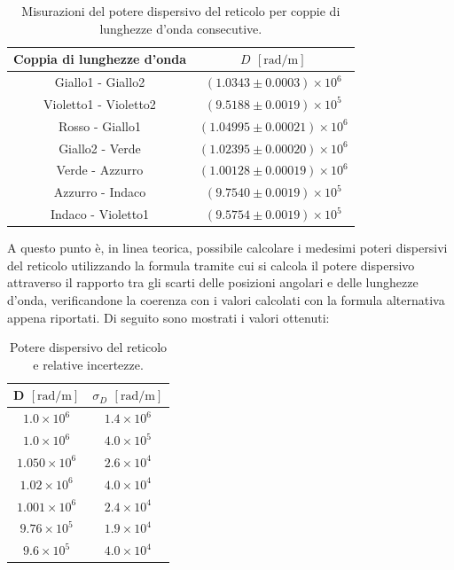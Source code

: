 \documentclass[a4paper,12pt]{article}
\begin{document}
\begin{table}[H]
\centering
\begin{tabular}{cc}
\hline
\textbf{Coppia di lunghezze d’onda} & \textbf{\( D \)} \([\text{rad}/\text{m}] \) \\ 
\hline
Giallo1 - Giallo2 & \( (1.0343 \pm 0.0003) \times 10^6 \) \\ 
Violetto1 - Violetto2 & \( (9.5188 \pm 0.0019) \times 10^5 \) \\ 
Rosso - Giallo1 & \( (1.04995 \pm 0.00021) \times 10^6 \) \\ 
Giallo2 - Verde & \( (1.02395 \pm 0.00020) \times 10^6 \) \\ 
Verde - Azzurro & \( (1.00128 \pm 0.00019) \times 10^6 \) \\ 
Azzurro - Indaco & \( (9.7540 \pm 0.0019) \times 10^5 \) \\ 
Indaco - Violetto1 & \( (9.5754 \pm 0.0019) \times 10^5 \) \\ 
\hline
\end{tabular}
\caption{Misurazioni del potere dispersivo del reticolo per coppie di lunghezze d’onda consecutive.}
\end{table}
A questo punto è, in linea teorica, possibile calcolare i medesimi poteri dispersivi del reticolo utilizzando la formula tramite cui si calcola il potere dispersivo attraverso il rapporto tra gli scarti delle posizioni angolari e delle lunghezze d’onda, verificandone la coerenza con i valori calcolati con la formula alternativa appena riportati.
Di seguito sono mostrati i valori ottenuti:
\begin{table}[H]
    \centering
    \begin{tabular}{cc}
    \hline
    \textbf{D} \([\text{rad}/\text{m}] \) & \textbf{\(\sigma_D\)} \([\text{rad}/\text{m}] \) \\ 
    \hline
    \( 1.0 \times 10^6 \) & \( 1.4 \times 10^6 \) \\ 
    \( 1.0 \times 10^6 \) & \( 4.0 \times 10^5 \) \\ 
    \( 1.050 \times 10^6 \) & \( 2.6 \times 10^4 \) \\ 
    \( 1.02 \times 10^6 \) & \( 4.0 \times 10^4 \) \\ 
    \( 1.001 \times 10^6 \) & \( 2.4 \times 10^4 \) \\ 
    \( 9.76 \times 10^5 \) & \( 1.9 \times 10^4 \) \\ 
    \( 9.6 \times 10^5 \) & \( 4.0 \times 10^4 \) \\ 
    \hline
    \end{tabular}
    \caption{Potere dispersivo del reticolo e relative incertezze.}
    \end{table}
    
\end{document}
